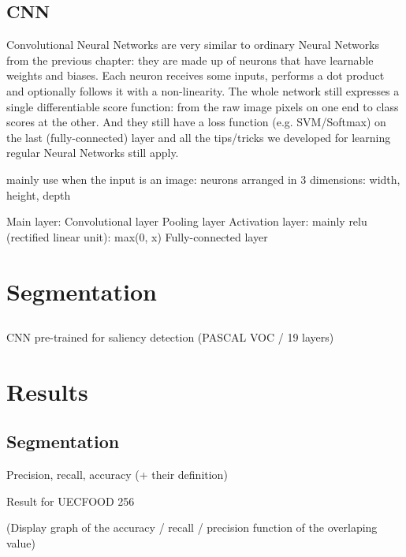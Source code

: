 \documentclass[aspectratio=169]{beamer}
\let\oldsection\section
\renewcommand{\section}[1]{
    \oldsection{#1}	
    \subsection{}
}
\newenvironment{myframe}[1][t]{\begin{frame}[#1]{\secname}{\subsecname}}{\end{frame}}
\begin{document}
    \subsection{CNN}
    
    \begin{myframe}
        Convolutional Neural Networks are very similar to ordinary Neural Networks from the previous chapter: they are made up of neurons that have learnable weights and biases. Each neuron receives some inputs, performs a dot product and optionally follows it with a non-linearity. The whole network still expresses a single differentiable score function: from the raw image pixels on one end to class scores at the other. And they still have a loss function (e.g. SVM/Softmax) on the last (fully-connected) layer and all the tips/tricks we developed for learning regular Neural Networks still apply.
        
        mainly use when the input is an image: neurons arranged in 3 dimensions: width, height, depth
        
        Main layer:
        Convolutional layer
        Pooling layer
        Activation layer: mainly relu (rectified linear unit): max(0, x)
        Fully-connected layer
    \end{myframe}
    
    \section{Segmentation}
    
    \begin{myframe}
        CNN pre-trained for saliency detection (PASCAL VOC / 19 layers)
    \end{myframe}
    
    \section{Results}
    
    \subsection{Segmentation}
    
    \begin{myframe}
        Precision, recall, accuracy (+ their definition)
        
        Result for UECFOOD 256
        
        (Display graph of the accuracy / recall / precision function of the overlaping value)
    \end{myframe}
    
\end{document}
